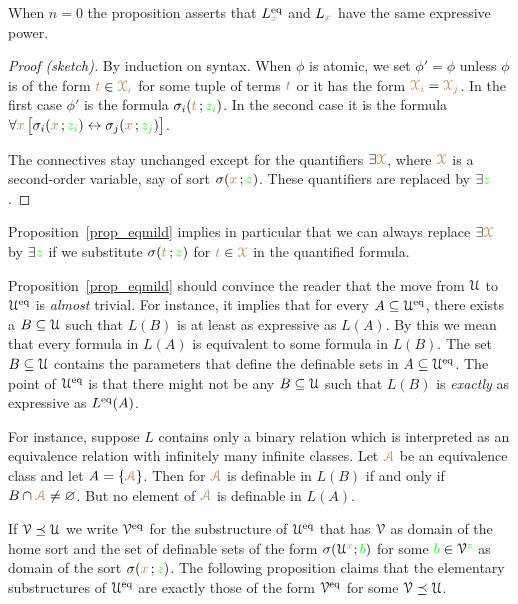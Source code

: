 When $n=0$ the proposition asserts that $L_{{\color{brown} x}}^{{\rm eq}}$ and $L_{{\color{brown} x}}$ have the same expressive power.

\begin{proof}[Proof (sketch)]
By induction on syntax.
When $\phi$ is atomic, we set $\phi'=\phi$ unless $\phi$ is of the form ${\color{brown} t}\in {\color{brown}\EuScript X_i}$ for some tuple of terms ${\color{brown} t}$ or it has the form ${\color{brown}\EuScript X_i}={\color{brown}\EuScript X_j}$.
In the first case $\phi'$ is the formula $\sigma_i({\color{brown} t}\,;{\color{green} z_i})$.
In the second case it is the formula $\forall {\color{brown}x}\,\big[\sigma_i({\color{brown} x}\,;{\color{green} z_i}) \leftrightarrow\sigma_j({\color{brown} x}\,;{\color{green} z_j})\big]$. 

The connectives stay unchanged except for the quantifiers $\exists {\color{brown}\EuScript X}$, where ${\color{brown}\EuScript X}$ is a second-order variable, say of sort $\sigma({\color{brown} x}\,;{\color{green} z})$.
These quantifiers are replaced by $\exists{\color{green}z}$.
\end{proof}

Proposition~\ref{prop_eqmild} implies in particular that we can always replace $\exists {\color{brown}\EuScript X}$ by $\exists {\color{green}z}$ if we substitute $\sigma({\color{brown} t}\,;{\color{green} z})$ for ${\color{brown} t}\in {\color{brown}\EuScript X}$ in the quantified formula.



\begin{remark}\label{rem_eqmild}
Proposition~\ref{prop_eqmild} should convince the reader that the move from $\EuScript U$ to $\EuScript U^{{\rm eq}}$ is \textit{almost\/} trivial.
For instance, it implies that for every $A\subseteq\EuScript U^{{\rm eq}}$, there exists a $B\subseteq\EuScript U$ such that $L(B)$ is at least as expressive as $L(A)$.
By this we mean that every formula in $L(A)$ is equivalent to some formula in $L(B)$.
The set $B\subseteq\EuScript U$ contains the parameters that define the definable sets in $A\subseteq\EuScript U^{{\rm eq}}$.
The point of $\EuScript U^{{\rm eq}}$ is that there might not be any $B\subseteq\EuScript U$ such that $L(B)$ is \textit{exactly\/} as expressive as $L^{{\rm eq}}(A)$.

For instance, suppose $L$ contains only a binary relation which is interpreted as an equivalence relation with infinitely many infinite classes.
Let ${\color{brown}\EuScript A}$ be an equivalence class and let $A=\{{\color{brown}\EuScript A}\}$.
Then for ${\color{brown}\EuScript A}$ is definable in $L(B)$ if and only if $B\cap {\color{brown}\EuScript A}\neq\varnothing$.
But no element of ${\color{brown}\EuScript A}$ is definable in $L(A)$.
\end{remark}

If $\EuScript V\preceq\EuScript U$ we write \emph{$\EuScript V^{{{\rm eq}}}$\/} for the substructure of $\EuScript U^{{\rm eq}}$ that has $\EuScript V$ as domain of the home sort and  the set of definable sets of the form $\sigma(\EuScript U^{\color{brown} x};{\color{green} b})$ for some ${\color{green} b}\in \EuScript V^{\color{green} z}$ as domain of the sort $\sigma({\color{brown} x}\,;{\color{green} z})$.
The following proposition claims that the elementary substructures of $\EuScript U^{{\rm eq}}$ are exactly those of the form $\EuScript V^{{\rm eq}}$ for some $\EuScript V\preceq\EuScript U$.

